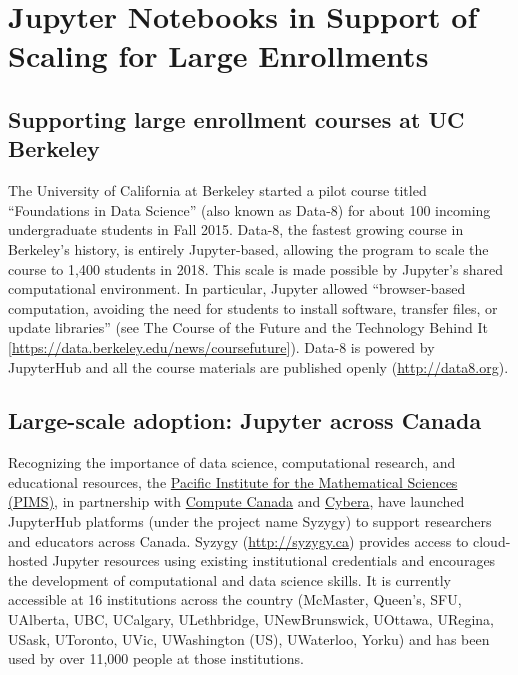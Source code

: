 \documentclass[]{book}
\begin{document}
\section{Jupyter Notebooks in Support of Scaling for Large
Enrollments}\label{jupyter-notebooks-in-support-of-scaling-for-large-enrollments}

\subsection{Supporting large enrollment courses at UC
Berkeley}\label{supporting-large-enrollment-courses-at-uc-berkeley}

The University of California at Berkeley started a pilot course titled
``Foundations in Data Science'' (also known as Data-8) for about 100
incoming undergraduate students in Fall 2015. Data-8, the fastest
growing course in Berkeley's history, is entirely Jupyter-based,
allowing the program to scale the course to 1,400 students in 2018. This
scale is made possible by Jupyter's shared computational environment. In
particular, Jupyter allowed ``browser-based computation, avoiding the
need for students to install software, transfer files, or update
libraries'' (see The Course of the Future and the Technology Behind It
{[}\url{https://data.berkeley.edu/news/coursefuture}{]}). Data-8 is
powered by JupyterHub and all the course materials are published openly
(\url{http://data8.org}).

\subsection{Large-scale adoption: Jupyter across
Canada}\label{large-scale-adoption-jupyter-across-canada}

Recognizing the importance of data science, computational research, and
educational resources, the \href{https://www.pims.math.ca/}{Pacific
Institute for the Mathematical Sciences (PIMS)}, in partnership with
\href{https://www.computecanada.ca/}{Compute Canada} and
\href{https://www.cybera.ca/}{Cybera}, have launched JupyterHub
platforms (under the project name Syzygy) to support researchers and
educators across Canada. Syzygy (\url{http://syzygy.ca}) provides access
to cloud-hosted Jupyter resources using existing institutional
credentials and encourages the development of computational and data
science skills. It is currently accessible at 16 institutions across the
country (McMaster, Queen's, SFU, UAlberta, UBC, UCalgary, ULethbridge,
UNewBrunswick, UOttawa, URegina, USask, UToronto, UVic, UWashington
(US), UWaterloo, Yorku) and has been used by over 11,000 people at those
institutions.
\end{document}
